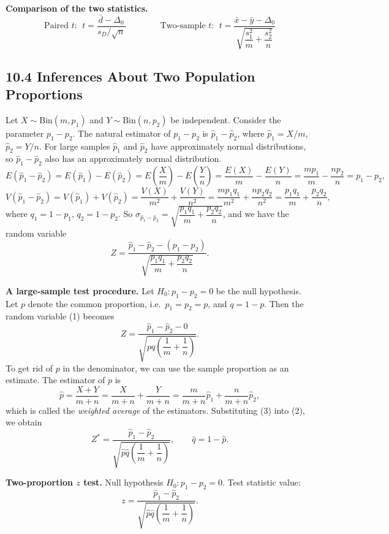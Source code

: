 \textbf{Comparison of the two statistics.}
\[
\text{Paired } t:\ \ t=\frac{\bar{d}-\Delta_0}{s_D/\sqrt{n}}
\qquad\qquad
\text{Two-sample } t:\ \ t=\frac{\bar{x}-\bar{y}-\Delta_0}{\sqrt{\dfrac{s_1^2}{m}+\dfrac{s_2^2}{n}}}
\]

\subsection*{10.4 Inferences About Two Population Proportions}

Let $X\sim\text{Bin}(m,p_1)$ and $Y\sim\text{Bin}(n,p_2)$ be independent. Consider the parameter $p_1-p_2$.
The natural estimator of $p_1-p_2$ is $\hat{p}_1-\hat{p}_2$, where $\hat p_1=X/m$, $\hat p_2=Y/n$.
For large samples $\hat{p}_1$ and $\hat{p}_2$ have approximately normal distributions, so $\hat{p}_1-\hat{p}_2$ also has an approximately normal distribution.
\[
E(\hat{p}_1-\hat{p}_2) = E(\hat{p}_1)-E(\hat{p}_2) = E\!\left(\frac{X}{m}\right)-E\!\left(\frac{Y}{n}\right) = \frac{E(X)}{m}-\frac{E(Y)}{n} = \frac{mp_1}{m}-\frac{np_2}{n} = p_1-p_2,
\]
\[
V(\hat{p}_1-\hat{p}_2) = V(\hat{p}_1)+V(\hat{p}_2) = \frac{V(X)}{m^2}+\frac{V(Y)}{n^2} = \frac{mp_1q_1}{m^2}+\frac{np_2q_2}{n^2} = \frac{p_1q_1}{m}+\frac{p_2q_2}{n},
\]
where $q_1=1-p_1$, $q_2=1-p_2$. So
$\sigma_{\hat{p}_1-\hat{p}_2}=\sqrt{\dfrac{p_1q_1}{m}+\dfrac{p_2q_2}{n}}$, and we have the random variable
\[
Z = \frac{\hat{p}_1-\hat{p}_2-(p_1-p_2)}{\sqrt{\dfrac{p_1q_1}{m}+\dfrac{p_2q_2}{n}}}. \tag{1}
\]

\textbf{A large-sample test procedure.} Let $H_0:p_1-p_2=0$ be the null hypothesis.
Let $p$ denote the common proportion, i.e.\ $p_1=p_2=p$, and $q=1-p$. Then the random variable (1) becomes
\[
Z = \frac{\hat{p}_1-\hat{p}_2-0}{\sqrt{pq\left(\dfrac{1}{m}+\dfrac{1}{n}\right)}}. \tag{2}
\]
To get rid of $p$ in the denominator, we can use the sample proportion as an estimate. The estimator of $p$ is
\[
\hat{p} = \frac{X+Y}{m+n} = \frac{X}{m+n}+\frac{Y}{m+n} = \frac{m}{m+n}\hat{p}_1+\frac{n}{m+n}\hat{p}_2, \tag{3}
\]
which is called the \emph{weighted average} of the estimators. Substituting (3) into (2), we obtain
\[
Z^* = \frac{\hat{p}_1-\hat{p}_2}{\sqrt{\hat{p}\hat{q}\left(\dfrac{1}{m}+\dfrac{1}{n}\right)}},\qquad \hat{q}=1-\hat{p}.
\]

\textbf{Two-proportion $z$ test.} Null hypothesis $H_0:p_1-p_2=0$. Test statistic value:
\[
z = \frac{\hat{p}_1-\hat{p}_2}{\sqrt{\hat{p}\hat{q}\left(\dfrac{1}{m}+\dfrac{1}{n}\right)}}.
\]

